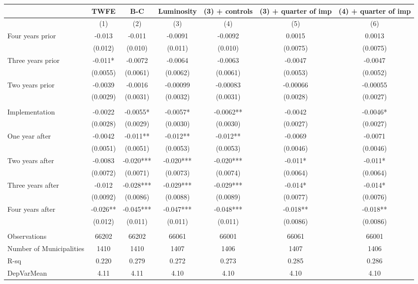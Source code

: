 \begin{tabular}{lcccccc}
\toprule
      & TWFE  & B-C   & Luminosity & (3) + controls & (3) + quarter of imp & (4) + quarter of imp \\
\midrule
      & (1)   & (2)   & (3)   & (4)   & (5)   & (6) \\
\midrule
\midrule
Four years prior & -0.013 & -0.011 & -0.0091 & -0.0092 & 0.0015 & 0.0013 \\
      & (0.012) & (0.010) & (0.011) & (0.010) & (0.0075) & (0.0075) \\
Three years prior & -0.011* & -0.0072 & -0.0064 & -0.0063 & -0.0047 & -0.0047 \\
      & (0.0055) & (0.0061) & (0.0062) & (0.0061) & (0.0053) & (0.0052) \\
Two years prior & -0.0039 & -0.0016 & -0.00099 & -0.00083 & -0.00066 & -0.00055 \\
      & (0.0029) & (0.0031) & (0.0032) & (0.0031) & (0.0028) & (0.0027) \\
      &       &       &       &       &       &  \\
Implementation & -0.0022 & -0.0055* & -0.0057* & -0.0062** & -0.0042 & -0.0046* \\
      & (0.0028) & (0.0029) & (0.0030) & (0.0030) & (0.0027) & (0.0027) \\
One year after & -0.0042 & -0.011** & -0.012** & -0.012** & -0.0069 & -0.0071 \\
      & (0.0051) & (0.0051) & (0.0053) & (0.0053) & (0.0046) & (0.0046) \\
Two years after & -0.0083 & -0.020*** & -0.020*** & -0.020*** & -0.011* & -0.011* \\
      & (0.0072) & (0.0071) & (0.0073) & (0.0074) & (0.0064) & (0.0064) \\
Three years after & -0.012 & -0.028*** & -0.029*** & -0.029*** & -0.014* & -0.014* \\
      & (0.0092) & (0.0086) & (0.0088) & (0.0089) & (0.0077) & (0.0076) \\
Four years after & -0.026** & -0.045*** & -0.047*** & -0.048*** & -0.018** & -0.018** \\
      & (0.012) & (0.011) & (0.011) & (0.011) & (0.0086) & (0.0086) \\
      &       &       &       &       &       &  \\
\midrule
Observations & 66202 & 66202 & 66061 & 66001 & 66061 & 66001 \\
Number of Municipalities & 1410  & 1410  & 1407  & 1406  & 1407  & 1406 \\
R-sq  & 0.220 & 0.279 & 0.272 & 0.273 & 0.285 & 0.286 \\
DepVarMean & 4.11  & 4.11  & 4.10  & 4.10  & 4.10  & 4.10 \\
\bottomrule
\bottomrule
\end{tabular}%
